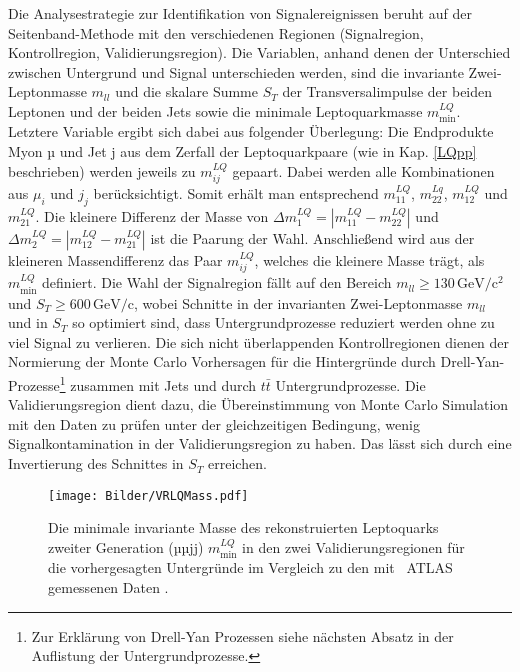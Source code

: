Die Analysestrategie zur Identifikation von Signalereignissen beruht auf der Sei\-ten\-band-Methode mit den verschiedenen Regionen (Signalregion, Kontrollregion, Validierungsregion). Die Variablen, anhand denen der Unterschied zwischen Untergrund und Signal unterschieden werden, sind die invariante Zwei-Leptonmasse $m_{ll}$ und die skalare Summe $S_T$ der Transversalimpulse der beiden Leptonen und der beiden Jets sowie die minimale Leptoquarkmasse $m_{\text{min}}^{LQ}$. Letztere Variable ergibt sich dabei aus folgender Überlegung: Die Endprodukte Myon µ und Jet j aus dem Zerfall der Leptoquarkpaare (wie in Kap. \ref{LQpp} beschrieben) werden jeweils zu $m_{ij}^{LQ}$ gepaart. Dabei werden alle Kombinationen aus $\mu_i$ und $j_j$ berücksichtigt. Somit erhält man entsprechend $m_{11}^{LQ}$, $m_{22}^{Lq}$, $m_{12}^{LQ}$ und $m_{21}^{LQ}$. Die kleinere Differenz der Masse von $\Delta m_{1}^{LQ}=|m_{11}^{LQ}-m_{22}^{LQ}|$ und $\Delta m_{2}^{LQ}=|m_{12}^{LQ}-m_{21}^{LQ}|$ ist die Paarung der Wahl. Anschließend wird aus der kleineren Massendifferenz das Paar $m_{ij}^{LQ}$, welches die kleinere Masse trägt, als $m_{\text{min}}^{LQ}$ definiert. Die Wahl der Signalregion fällt auf den Bereich $m_{ll}\geq130\,\text{GeV}/\text{c}^2$ und $S_{T}\geq600\,\text{GeV}/\text{c}$, wobei Schnitte in der invarianten Zwei-Leptonmasse $m_{ll}$ und in $S_{T}$ so optimiert sind, dass Untergrundprozesse reduziert werden ohne zu viel Signal zu verlieren. Die sich nicht überlappenden Kontrollregionen dienen der Normierung der Monte Carlo Vorhersagen für die Hintergründe durch Drell-Yan-Prozesse\footnote{Zur Erklärung von Drell-Yan Prozessen siehe nächsten Absatz in der Auflistung der Untergrundprozesse.} zusammen mit Jets und durch $t\bar{t}$ Untergrundprozesse. Die Validierungsregion dient dazu, die Übereinstimmung von Monte Carlo Simulation mit den Daten zu prüfen unter der gleichzeitigen Bedingung, wenig Signalkontamination in der Validierungsregion zu haben. Das lässt sich durch eine Invertierung des Schnittes in $S_T$ erreichen.%
\begin{figure}[htbp]                                 
  \begin{center}                                       
  \texttt{[image: Bilder/VRLQMass.pdf]} 
   \caption[Die minimale invariante Masse des rekonstruierten Leptoquarks zweiter Generation in den zwei Validierungsregionen]{Die minimale invariante Masse des rekonstruierten Leptoquarks zweiter Generation (µµjj) $m_{\text{min}}^{LQ}$ in den zwei Validierungsregionen für die vorhergesagten Untergründe im Vergleich zu den mit ~ATLAS gemessenen Daten \cite{LQATLAS}.}
   \label{VRLQMass}                                     
   \end{center}
\end{figure}

